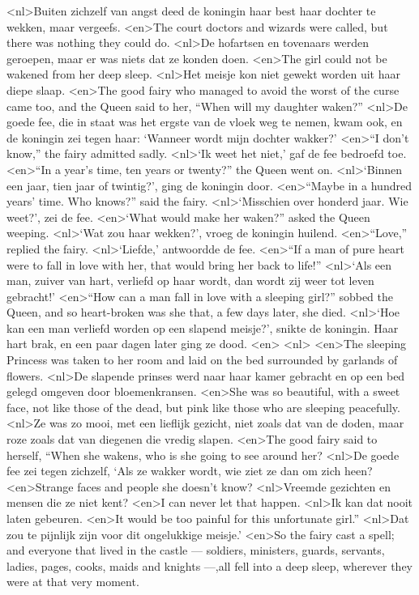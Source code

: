 <nl>Buiten zichzelf van angst deed de koningin haar best haar dochter  te wekken, maar vergeefs. 
<en>The court doctors and wizards were called, but there was nothing they could do.
<nl>De hofartsen en tovenaars werden geroepen, maar er was niets dat ze konden doen.
<en>The girl could not be wakened from her deep sleep.
<nl>Het meisje kon niet gewekt worden uit haar diepe slaap.
<en>The good fairy who managed to avoid the worst of the curse came too, and the Queen said to her, “When will my daughter waken?” 
<nl>De goede fee, die in staat was het ergste van de vloek weg te nemen, kwam ook, en de koningin zei tegen haar: `Wanneer wordt mijn dochter wakker?' 
<en>“I don’t know,” the fairy admitted sadly.
<nl>`Ik weet het niet,' gaf de fee bedroefd toe.
<en>“In a year’s time, ten years or twenty?” the Queen went on.
<nl>`Binnen een jaar, tien jaar of twintig?', ging de koningin door.
<en>“Maybe in a hundred years’ time. Who knows?” said the fairy.
<nl>`Misschien over honderd jaar. Wie weet?', zei de fee.
<en>`What would make her waken?” asked the Queen weeping.
<nl>`Wat zou haar wekken?', vroeg de koningin huilend.
<en>“Love,” replied the fairy.
<nl>`Liefde,' antwoordde de fee.
<en>“If a man of pure heart were to fall in love with her, that would bring her back to life!”
<nl>`Als een man, zuiver van hart, verliefd op haar wordt, dan wordt zij weer tot leven gebracht!'
<en>“How can a man fall in love with a sleeping girl?” sobbed the Queen, and so heart-broken was she that, a few days later, she died.
<nl>`Hoe kan een man verliefd worden op een slapend meisje?', snikte de koningin. Haar hart brak, en een paar dagen later ging ze dood.
<en>
<nl>
<en>The sleeping Princess was taken to her room and laid on the bed surrounded by garlands of flowers.
<nl>De slapende prinses werd naar haar kamer gebracht en op een bed gelegd omgeven door bloemenkransen.
<en>She was so beautiful, with a sweet face, not like those of the dead, but pink like those who are sleeping peacefully.
<nl>Ze was zo mooi, met een lieflijk gezicht, niet zoals dat van de doden, maar roze zoals dat van diegenen die vredig slapen.
<en>The good fairy said to herself, “When she wakens, who is she going to see around her?
<nl>De goede fee zei tegen zichzelf, `Als ze wakker wordt, wie ziet ze dan om zich heen?
<en>Strange faces and people she doesn’t know?
<nl>Vreemde gezichten en mensen die ze niet kent?
<en>I can never let that happen.
<nl>Ik kan dat nooit laten gebeuren.
<en>It would be too painful for this unfortunate girl.”
<nl>Dat zou te pijnlijk zijn voor dit ongelukkige meisje.'
<en>So the fairy cast a spell; and everyone that lived in the castle --- soldiers, ministers, guards, servants, ladies, pages, cooks, maids and knights –--,all fell into a deep sleep, wherever they were at that very moment.
